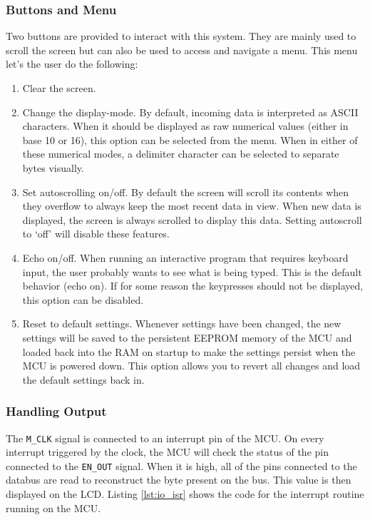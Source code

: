 \subsubsection{Buttons and Menu}
Two buttons are provided to interact with this system. They are mainly used to scroll the screen but can also be used to access and navigate a menu. This menu let's the user do the following:
\begin{enumerate}
\item Clear the screen.
\item Change the display-mode. By default, incoming data is interpreted as ASCII characters. When it should be displayed as raw numerical values (either in base 10 or 16), this option can be selected from the menu. When in either of these numerical modes, a delimiter character can be selected to separate bytes visually.
\item Set autoscrolling on/off. By default the screen will scroll its contents when they overflow to always keep the most recent data in view. When new data is displayed, the screen is always scrolled to display this data. Setting autoscroll to `off' will disable these features.
\item Echo on/off. When running an interactive program that requires keyboard input, the user probably wants to see what is being typed. This is the default behavior (echo on). If for some reason the keypresses should not be displayed, this option can be disabled.
\item Reset to default settings. Whenever settings have been changed, the new settings will be saved to the persistent EEPROM memory of the MCU and loaded back into the RAM on startup to make the settings persist when the MCU is powered down. This option allows you to revert all changes and load the default settings back in.
\end{enumerate}

\subsubsection{Handling Output}
The \texttt{M\_CLK} signal is connected to an interrupt pin of the MCU. On every interrupt triggered by the clock, the MCU will check the status of the pin connected to the \texttt{EN\_OUT} signal. When it is high, all of the pins connected to the databus are read to reconstruct the byte present on the bus. This value is then displayed on the LCD. Listing \ref{lst:io_isr} shows the code for the interrupt routine running on the MCU.

